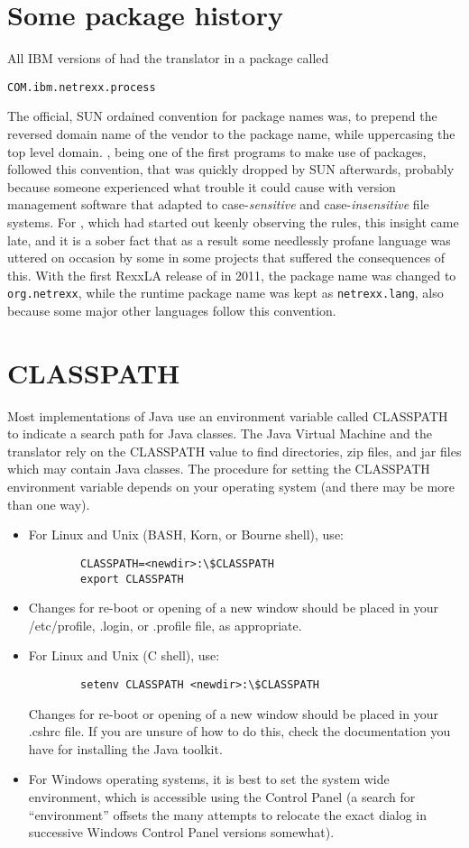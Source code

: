 \section{Some \nr{} package history}
All IBM versions of \nr{} had the translator in a package called
\begin{verbatim}
COM.ibm.netrexx.process 
\end{verbatim}
The official, SUN ordained
convention for package names was, to prepend the reversed domain name
of the vendor to the package name, while uppercasing the top level
domain. \nr{}, being one of the first programs to make use of
packages, followed this convention, that was quickly dropped by SUN
afterwards, probably because someone experienced what trouble it could
cause with version management software that adapted to
case-\emph{sensitive} and case-\emph{insensitive} file systems. For
\nr{}, which had started out keenly observing the rules, this
insight came late, and it is a sober fact that as a result some needlessly profane
language was uttered on occasion by some in some projects that suffered the consequences of
this. With the first RexxLA release of \nr{} in 2011, the package
name was changed to \texttt{org.netrexx}, while the runtime package
name was kept as \texttt{netrexx.lang}, also because some major other
languages follow this convention.
\section{CLASSPATH}
Most implementations of Java use an environment variable called
CLASSPATH to indicate a search path for Java classes. The Java Virtual
Machine and the \nr{} translator rely on the CLASSPATH value to find directories, zip files, and jar files which may contain Java classes. 
The procedure for setting the CLASSPATH environment variable depends on your operating system (and there may be more than one way).
\begin{itemize}
\item For Linux and Unix (BASH, Korn, or Bourne shell), use:
\begin{verbatim}
        CLASSPATH=<newdir>:\$CLASSPATH 
        export CLASSPATH
\end{verbatim}

\item Changes for re-boot or opening of a new window should be placed in your /etc/profile, .login, or .profile file, as appropriate. 
\item For Linux and Unix (C shell), use:
\begin{verbatim}
        setenv CLASSPATH <newdir>:\$CLASSPATH 
\end{verbatim}
Changes for re-boot or opening of a new window should be placed in
your .cshrc file. If you are unsure of how to do this, check the
documentation you have for installing the Java toolkit.
\item For Windows operating systems, it is best to set the system wide
  environment, which is accessible using the Control Panel (a search
  for ``environment'' offsets the many attempts to relocate the exact
  dialog in successive Windows Control Panel versions somewhat).
\end{itemize}


